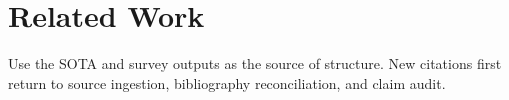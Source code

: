 \section{Related Work}

Use the SOTA and survey outputs as the source of structure. New citations first
return to source ingestion, bibliography reconciliation, and claim audit.
